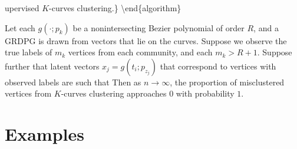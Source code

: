 \documentclass[12pt]{article}
\begin{document}
upervised \(K\)-curves clustering.\} \textbackslash end\{algorithm\}

\begin{theorem}
Let each $g(\cdot; p_k)$ be a nonintersecting Bezier polynomial of order $R$, 
and a GRDPG is drawn from vectors that lie on the curves. 
Suppose we observe the true labels of $m_k$ vertices from each community, and each $m_k > R + 1$. Suppose further that latent vectors $x_j = g(t_i; p_{z_j})$ that correspond to vertices with observed labels are such that 
Then as $n \to \infty$, the proportion of misclustered vertices from $K$-curves clustering approaches $0$ with probability $1$.
\end{theorem}

\hypertarget{examples}{%
\section{Examples}\label{examples}}
\end{document}
